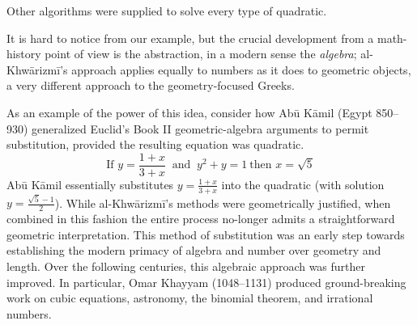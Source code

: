 Other algorithms were supplied to solve every type of quadratic.\medbreak

It is hard to notice from our example, but the crucial development from a math-history point of view is the abstraction, in a modern sense the \emph{algebra}; al-Khwārizmī's approach applies equally to numbers as it does to geometric objects, a very different approach to the geometry-focused Greeks.\medbreak

As an example of the power of this idea, consider how Abū Kāmil (Egypt 850--930) generalized Euclid's Book II geometric-algebra arguments to permit substitution, provided the resulting equation was quadratic.
\[
	\text{If }y=\frac{1+x}{3+x}\ \text{ and }\ y^2+y=1\ \text{then }x=\sqrt 5
\]
Abū Kāmil essentially substitutes $y=\frac{1+x}{3+x}$ into the quadratic (with solution $y=\frac{\sqrt 5-1}2$). While al-Khwārizmī's methods were geometrically justified, when combined in this fashion the entire process no-longer admits a straightforward geometric interpretation. This method of substitution was an early step towards establishing the modern primacy of algebra and number over geometry and length.\smallbreak
Over the following centuries, this algebraic approach was further improved. In particular, Omar Khayyam (1048--1131) produced ground-breaking work on cubic equations, astronomy, the binomial theorem, and irrational numbers.


